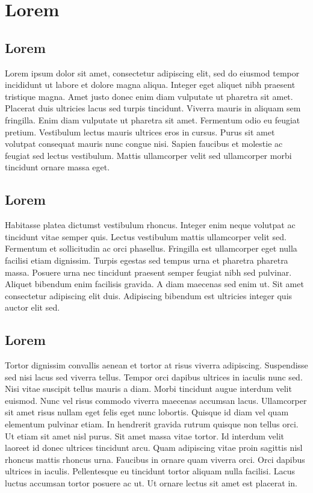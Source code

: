 \fancyhead[L]{\nouppercase{}} 
\section{Lorem}\label{kennzahlenauswertung}
\subsection{Lorem}
Lorem ipsum dolor sit amet, consectetur adipiscing elit, sed do eiusmod tempor incididunt ut labore et dolore magna aliqua. Integer eget aliquet nibh praesent tristique magna. Amet justo donec enim diam vulputate ut pharetra sit amet. Placerat duis ultricies lacus sed turpis tincidunt. Viverra mauris in aliquam sem fringilla. Enim diam vulputate ut pharetra sit amet. Fermentum odio eu feugiat pretium. Vestibulum lectus mauris ultrices eros in cursus. Purus sit amet volutpat consequat mauris nunc congue nisi. Sapien faucibus et molestie ac feugiat sed lectus vestibulum. Mattis ullamcorper velit sed ullamcorper morbi tincidunt ornare massa eget.
\subsection{Lorem}
Habitasse platea dictumst vestibulum rhoncus. Integer enim neque volutpat ac tincidunt vitae semper quis. Lectus vestibulum mattis ullamcorper velit sed. Fermentum et sollicitudin ac orci phasellus. Fringilla est ullamcorper eget nulla facilisi etiam dignissim. Turpis egestas sed tempus urna et pharetra pharetra massa. Posuere urna nec tincidunt praesent semper feugiat nibh sed pulvinar. Aliquet bibendum enim facilisis gravida. A diam maecenas sed enim ut. Sit amet consectetur adipiscing elit duis. Adipiscing bibendum est ultricies integer quis auctor elit sed.
\subsection{Lorem}
Tortor dignissim convallis aenean et tortor at risus viverra adipiscing. Suspendisse sed nisi lacus sed viverra tellus. Tempor orci dapibus ultrices in iaculis nunc sed. Nisi vitae suscipit tellus mauris a diam. Morbi tincidunt augue interdum velit euismod. Nunc vel risus commodo viverra maecenas accumsan lacus. Ullamcorper sit amet risus nullam eget felis eget nunc lobortis. Quisque id diam vel quam elementum pulvinar etiam. In hendrerit gravida rutrum quisque non tellus orci. Ut etiam sit amet nisl purus. Sit amet massa vitae tortor. Id interdum velit laoreet id donec ultrices tincidunt arcu. Quam adipiscing vitae proin sagittis nisl rhoncus mattis rhoncus urna. Faucibus in ornare quam viverra orci. Orci dapibus ultrices in iaculis. Pellentesque eu tincidunt tortor aliquam nulla facilisi. Lacus luctus accumsan tortor posuere ac ut. Ut ornare lectus sit amet est placerat in.
